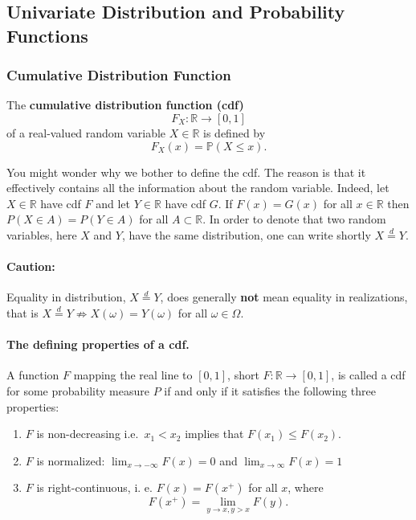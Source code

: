 \documentclass[
  14pt,
]{memoir}
\begin{document}
\hypertarget{univariate-distribution-and-probability-functions}{%
\subsection{Univariate Distribution and Probability Functions}\label{univariate-distribution-and-probability-functions}}

\hypertarget{cumulative-distribution-function}{%
\subsubsection{Cumulative Distribution Function}\label{cumulative-distribution-function}}

The \textbf{cumulative distribution function (cdf)}
\[F_{X}: \mathbb{R} \rightarrow [0,1]\]
of a real-valued random variable \(X\in\mathbb{R}\) is defined by
\[
F_{X}(x)=\mathbb{P}(X \leq x).
\]

You might wonder why we bother to define the cdf. The reason is that it effectively contains all the information
about the random variable. Indeed, let \(X\in\mathbb{R}\) have cdf \(F\) and let \(Y\in\mathbb{R}\) have cdf \(G\). If \(F(x)=G(x)\) for all \(x\in\mathbb{R}\) then \(P(X \in A)=P(Y \in A)\) for all \(A\subset\mathbb{R}\). In order to denote that two random variables, here \(X\) and \(Y\), have the same distribution, one can write shortly \(X\overset{d}{=}Y\).

\bigskip

\paragraph*{Caution:}

Equality in distribution, \(X\overset{d}{=}Y\), does generally \textbf{not} mean equality in realizations, that is \(X\overset{d}{=}Y \not\Rightarrow X(\omega)=Y(\omega)\) for all \(\omega\in\Omega\).

\bigskip

\paragraph*{The defining properties of a cdf.}

A function \(F\) mapping the real line to \([0,1]\), short \(F:\mathbb{R}\to[0,1]\), is called a cdf for some probability measure \(P\) if and only if it satisfies the following three properties:

\begin{enumerate}
\def\labelenumi{\arabic{enumi}.}
\item
  \(F\) is non-decreasing i.e.~\(x_{1}<x_{2}\) implies that \(F\left(x_{1}\right) \leq F\left(x_{2}\right)\).
\item
  \(F\) is normalized: \(\lim_{x\rightarrow-\infty} F(x)=0\) and \(\lim_{x \rightarrow \infty} F(x)=1\)
\item
  \(F\) is right-continuous, i. e. \(F(x)=F\left(x^{+}\right)\) for all \(x\), where
  \[
    F\left(x^{+}\right)=\lim_{y\to x, y>x} F(y).
    \]
\end{enumerate}
\end{document}
